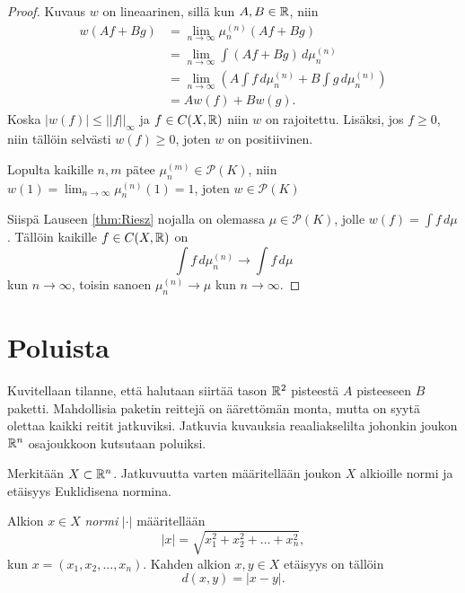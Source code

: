 \documentclass[12pt,oneside,a4paper]{amsbook} %
\begin{document}
\begin{proof}
    Kuvaus $w$ on lineaarinen, sillä kun $A, B \in \mathbb{R}$, niin
    \begin{align*}
        w(A f + B g) &= \lim_{n \to \infty} \mu_n^{(n)}(A f + B g) \\
        &=\lim_{n \to \infty} \int (A f + B g) \, d\mu_n^{(n)} \\
        &=\lim_{n \to \infty}  \left(A \int f \, d\mu_n^{(n)} + B \int g \, d\mu_n^{(n)}\right)  \\
        &= A w(f) + B w(g).
    \end{align*}
    Koska $|w(f)| \le ||f||_\infty$ ja $f \in C(X, \mathbb{R})$ niin $w$ on rajoitettu. Lisäksi, jos $f \ge 0$, niin tällöin selvästi $w(f) \ge 0$, joten $w$ on positiivinen.

Lopulta kaikille $n, m$ pätee $\mu_n^{(m)} \in \mathcal P(K)$, niin $w(1) = \lim_{n\to\infty} \mu_n^{(n)}(1) = 1$, joten $w \in \mathcal P(K)$

    Siispä Lauseen \ref{thm:Riesz} nojalla on olemassa $\mu \in \mathcal P(K)$, jolle $w(f) = \int f \, d\mu$. Tällöin kaikille $f \in C(X, \mathbb{R})$ on
    \begin{equation*}
        \int f \, d\mu_n^{(n)} \to \int f \, d\mu
    \end{equation*}
    kun $n \to \infty$, toisin sanoen $\mu_n^{(n)} \to \mu$ kun $n \to \infty$.
\end{proof}


\section{Poluista}
Kuvitellaan tilanne, että halutaan siirtää tason $\mathbb{R}^2$ pisteestä $A$ pisteeseen $B$ paketti. Mahdollisia paketin reittejä on äärettömän monta, mutta on syytä olettaa kaikki reitit jatkuviksi. Jatkuvia kuvauksia reaaliakselilta johonkin joukon $\mathbb{R}^n$ osajoukkoon kutsutaan poluiksi. 

Merkitään $X \subset \mathbb{R}^n$. Jatkuvuutta varten määritellään joukon $X$ alkioille normi ja etäisyys Euklidisena normina.
\begin{definition}
    Alkion $x \in X$ \textit{normi} $|\cdot|$ määritellään
    \begin{equation*}
        |x| = \sqrt{x_1^2 + x_2^2 + ... + x_n^2},
    \end{equation*}
    kun $x = (x_1, x_2, ... , x_n)$. Kahden alkion $x, y \in X$ etäisyys on tällöin
    \begin{equation*}
        d(x, y) = |x - y|.
    \end{equation*}
\end{definition}
\end{document}
